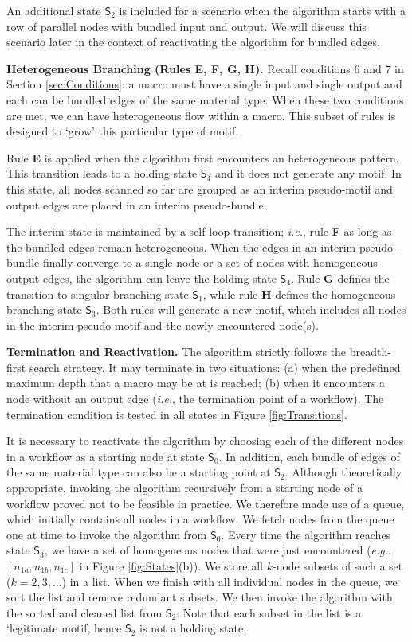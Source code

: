 An additional state $\mathsf{S}_2$ is included for a scenario when the algorithm starts with a row of parallel nodes with bundled input and output.
We will discuss this scenario later in the context of reactivating the algorithm for bundled edges.

\noindent \textbf{Heterogeneous Branching (Rules E, F, G, H).}
%
Recall conditions 6 and 7 in Section \ref{sec:Conditions}: a macro must have a single input and single output and each can be bundled edges of the same material type.
When these two conditions are met, we can have heterogeneous flow within a macro.
This subset of rules is designed to `grow' this particular type of motif.

Rule \textbf{E} is applied when the algorithm first encounters an heterogeneous pattern.
This transition leads to a holding state $\mathsf{S}_4$ and it does not generate any motif.
In this state, all nodes scanned so far are grouped as an interim pseudo-motif and output edges are placed in an interim pseudo-bundle.

The interim state is maintained by a self-loop transition; \emph{i.e.}, rule \textbf{F} as long as the bundled edges remain heterogeneous.
When the edges in an interim pseudo-bundle finally converge to a single node or a set of nodes with homogeneous output edges, the algorithm can leave the holding state $\mathsf{S}_4$.
Rule \textbf{G} defines the transition to singular branching state $\mathsf{S}_1$, while rule \textbf{H} defines the homogeneous branching state $\mathsf{S}_3$.
Both rules will generate a new motif, which includes all nodes in the interim pseudo-motif and the newly encountered node(s).

\noindent \textbf{Termination and Reactivation.}
%
The algorithm strictly follows the breadth-first search strategy.
It may terminate in two situations:
(a) when the predefined maximum depth that a macro may be at is reached;
(b) when it encounters a node without an output edge (\emph{i.e.}, the termination point of a workflow).
The termination condition is tested in all states in Figure \ref{fig:Transitions}.

It is necessary to reactivate the algorithm by choosing each of the different nodes in a workflow as a starting node at state $\textsf{S}_0$.
In addition, each bundle of edges of the same material type can also be a starting point at $\textsf{S}_2$.
Although theoretically appropriate, invoking the algorithm recursively from a starting node of a workflow proved not to be feasible in practice.
We therefore made use of a queue, which initially contains all nodes in a workflow.
We fetch nodes from the queue one at time to invoke the algorithm from $\textsf{S}_0$.
Every time the algorithm reaches state $\textsf{S}_3$, we have a set of homogeneous nodes that were just encountered (\emph{e.g.}, $[n_{1a}, n_{1b}, n_{1c}]$ in Figure \ref{fig:States}(b)).
We store all $k$-node subsets of such a set ($k = 2, 3, \ldots$) in a list.
When we finish with all individual nodes in the queue, we sort the list and remove redundant subsets.
We then invoke the algorithm with the sorted and cleaned list from $\textsf{S}_2$.
Note that each subset in the list is a `legitimate motif, hence $\textsf{S}_2$ is not a holding state.

